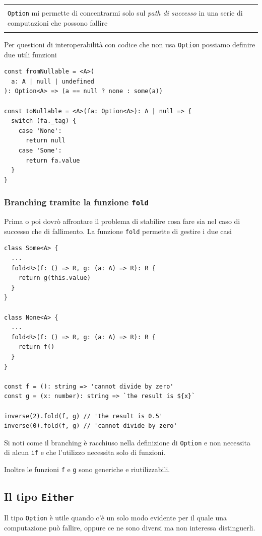 \documentclass[12pt]{article}
\newenvironment{demo}
    {\begin{center}
    \begin{tabular}{|p{0.9\textwidth}|}
    \hline\\
    }
    {
    \\\\\hline
    \end{tabular}
    \end{center}
    }
\begin{document}
\begin{demo}
\texttt{Option} mi permette di concentrarmi solo sul \emph{path di successo} in una serie di computazioni che possono fallire
\end{demo}

Per questioni di interoperabilità con codice che non usa \texttt{Option} possiamo definire due utili funzioni

\begin{verbatim}
const fromNullable = <A>(
  a: A | null | undefined
): Option<A> => (a == null ? none : some(a))

const toNullable = <A>(fa: Option<A>): A | null => {
  switch (fa._tag) {
    case 'None':
      return null
    case 'Some':
      return fa.value
  }
}
\end{verbatim}

\subsubsection{Branching tramite la funzione \texttt{fold}}

Prima o poi dovrò affrontare il problema di stabilire cosa fare sia nel caso di successo che di fallimento.
La funzione \texttt{fold} permette di gestire i due casi

\begin{verbatim}
class Some<A> {
  ...
  fold<R>(f: () => R, g: (a: A) => R): R {
    return g(this.value)
  }
}

class None<A> {
  ...
  fold<R>(f: () => R, g: (a: A) => R): R {
    return f()
  }
}

const f = (): string => 'cannot divide by zero'
const g = (x: number): string => `the result is ${x}`

inverse(2).fold(f, g) // 'the result is 0.5'
inverse(0).fold(f, g) // 'cannot divide by zero'
\end{verbatim}

Si noti come il branching è racchiuso nella definizione di \texttt{Option} e non necessita di alcun \texttt{if}
e che l'utilizzo necessita solo di funzioni.

Inoltre le funzioni \texttt{f} e \texttt{g} sono generiche e riutilizzabili.

\subsection{Il tipo \texttt{Either}}

Il tipo \texttt{Option} è utile quando c'è un solo modo evidente per il quale una computazione può fallire,
oppure ce ne sono diversi ma non interessa distinguerli.
\end{document}
